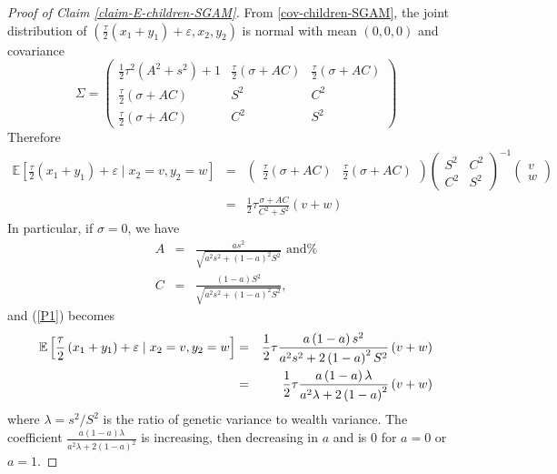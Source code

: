 \documentclass[
  12pt,
]{article}
\theoremstyle{definition}
\theoremstyle{definition}
\theoremstyle{definition}
\theoremstyle{definition}
\theoremstyle{remark}
\begin{document}
\begin{proof}[Proof of Claim \ref{claim-E-children-SGAM}]

From \eqref{cov-children-SGAM}, the joint distribution of $\left( \frac{\tau }{2}\left(
x_{1}+y_{1}\right) +\varepsilon ,x_{2},y_{2}\right) $ is normal with mean $%
\left( 0,0,0\right) $ and covariance$\allowbreak $%
\[
\Sigma =\left( 
\begin{array}{rrr}
\frac{1}{2}\tau ^{2}\left( A^{2}+s^{2}\right) +1 & \frac{\tau }{2}\left(
\sigma +AC\right)  & \frac{\tau }{2}\left( \sigma +AC\right)  \\ 
\frac{\tau }{2}\left( \sigma +AC\right)  & S^{2} & C^{2} \\ 
\frac{\tau }{2}\left( \sigma +AC\right)  & C^{2} & S^{2}%
\end{array}%
\right) 
\]%
Therefore
\begin{eqnarray}
\mathbb{E}\left[ \frac{\tau }{2}\left( x_{1}+y_{1}\right) +\varepsilon \mid
x_{2}=v,y_{2}=w\right]  &=&\left( 
\begin{array}{rr}
\frac{\tau }{2}\left( \sigma +AC\right)  & \frac{\tau }{2}\left( \sigma
+AC\right) 
\end{array}%
\right) \left( 
\begin{array}{rr}
S^{2} & C^{2} \\ 
C^{2} & S^{2}%
\end{array}%
\right) ^{-1}\left( 
\begin{array}{r}
v \\ 
w%
\end{array}%
\right)   \nonumber \\
&=&\frac{1}{2}\tau \frac{\sigma +AC}{C^{2}+S^{2}}\left( v+w\right) 
\label{P1}
\end{eqnarray}%
In particular, if $\sigma =0$, we have%
\begin{eqnarray*}
A &=&\frac{as^{2}}{\sqrt{a^{2}s^{2}+\left( 1-a\right) ^{2}S^{2}}}\textrm{ \ and%
} \\
C &=&\frac{\left( 1-a\right) S^{2}}{\sqrt{a^{2}s^{2}+\left( 1-a\right)
^{2}S^{2}}},
\end{eqnarray*}%
and (\ref{P1}) becomes 
\begin{eqnarray*}
\mathbb{E}\left[ \frac{\tau }{2}\left( x_{1}+y_{1}\right) +\varepsilon \mid
x_{2}=v,y_{2}=w\right]  &=&\frac{1}{2}\tau \frac{a\left( 1-a\right) s^{2}}{%
a^{2}s^{2}+2\left( 1-a\right) ^{2}S^{2}}\left( v+w\right)  \\
&=&\frac{1}{2}\tau \frac{a\left( 1-a\right) \lambda }{a^{2}\lambda +2\left(
1-a\right) ^{2}}\left( v+w\right) 
\end{eqnarray*}
where $\lambda =s^{2}/S^{2}$ is the ratio of genetic variance to wealth variance.
The coefficient $\frac{a\left( 1-a\right) \lambda }{a^{2}\lambda +2\left(
1-a\right) ^{2}}$ is increasing, then decreasing in $a$ and is 0 for $a =  0$ or $a = 1$.
\end{proof}
\end{document}
